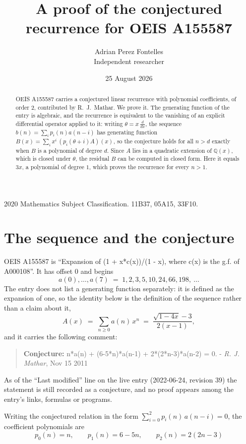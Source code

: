 \documentclass[11pt,a4paper]{article}
\title{A proof of the conjectured recurrence for OEIS A155587}
\author{Adrian Perez Fontelles\\ \small Independent researcher}
\date{25 August 2026}
\theoremstyle{plain}
\theoremstyle{definition}
\begin{document}
\maketitle

\begin{abstract}
OEIS A155587 carries a conjectured linear recurrence with polynomial coefficients, of
order 2, contributed by R.~J.~Mathar. We prove it. The generating function of the
entry is algebraic, and the recurrence is equivalent to the vanishing of an explicit
differential operator applied to it: writing $\theta=x\,\frac{d}{dx}$, the sequence
$b(n)=\sum_{i}p_{i}(n)a(n-i)$ has generating function
$B(x)=\sum_{i}x^{i}\,(p_{i}(\theta+i)A)(x)$, so the conjecture holds for all $n>d$ exactly
when $B$ is a polynomial of degree $d$. Since $A$ lies in a quadratic extension of
$\mathbb{Q}(x)$, which is closed under $\theta$, the residual $B$ can be computed in
closed form. Here it equals $3 x$, a polynomial of degree $1$, which proves
the recurrence for every $n>1$.
\end{abstract}

\noindent\small 2020 Mathematics Subject Classification. 11B37, 05A15, 33F10.\normalsize

\section{The sequence and the conjecture}

OEIS A155587 is ``Expansion of (1 + x*c(x))/(1 - x), where c(x) is the g.f. of A000108''. It has offset $0$ and begins
\[
a(0),\dots,a(7)\;=\;1, 2, 3, 5, 10, 24, 66, 198,\ \dots
\]
The entry does not list a generating function separately: it is defined as the
expansion of one, so the identity below is the definition of the sequence rather than a
claim about it,
\begin{equation}\label{eq:gf}
A(x)\;=\;\sum_{n\ge 0} a(n)\,x^{n}\;=\;\frac{\sqrt{1 - 4 x} - 3}{2 \left(x - 1\right)} ,
\end{equation}
and it carries the following comment:
\begin{quote}\small
\textbf{Conjecture:} n*a(n) + (6-5*n)*a(n-1) + 2*(2*n-3)*a(n-2) = 0. - \emph{R. J. Mathar}, Nov 15 2011
\end{quote}
As of the ``Last modified'' line on the live entry (2022-06-24, revision 39) the
statement is still recorded as a conjecture, and no proof appears among the entry's links,
formulas or programs.

Writing the conjectured relation in the form $\sum_{i=0}^{2}p_{i}(n)\,a(n-i)=0$,
the coefficient polynomials are
\[
p_{0}(n)=n,\qquad p_{1}(n)=6 - 5 n,\qquad p_{2}(n)=2 \left(2 n - 3\right)
\]
\end{document}
